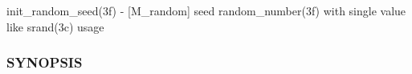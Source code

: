 \begin{DoxyCompactItemize}
\begin{DoxyCompactList}
init\+\_\+random\+\_\+seed(3f) -\/ \mbox{[}M\+\_\+random\mbox{]} seed random\+\_\+number(3f) with single value like srand(3c) usage \subsubsection*{S\+Y\+N\+O\+P\+S\+IS}\end{DoxyCompactList}\end{DoxyCompactItemize}
